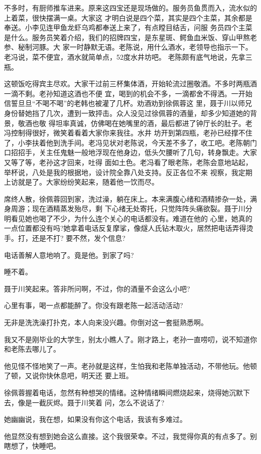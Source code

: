 \documentclass[11pt,a4paper,onecolumn]{article}
\begin{document}
不多时，有厨师推车进来。原来这四宝还是现场做的。服务员鱼贯而入，流水似的上着菜，很快摆满一桌。大家这
才明白说是四个菜，其实是四个主菜，其余都是奉送。小李见连甲鱼龙虾乌鸡都奉送上来了，有点瞠目结舌，问服
务员四个主菜是什么。服务员笑着介绍，我们的招牌四宝，是东星斑、鳄鱼血米饭、穿山甲熬老参、秘制河豚。大
家一时静默无语。老陈说，用什么酒水，老领导也指示一下。老冯说，菜不便宜，酒水就简单点，52度水井坊吧。
老陈颇有底气地说，先拿三瓶。

这顿饭吃得宾主尽欢。大家干过前三杯集体酒，开始轮流过圈敬酒。不多时两瓶酒一滴不剩。老孙知道这酒也不便
宜，喝到的机会不多，一滴都舍不得洒。一开始信誓旦旦“不喝不喝”的老韩也被灌了几杯。劝酒劝到徐佩蓉这
里，聂于川以师兄身份替她挡了几次，遭到一致抨击。众人没见过徐佩蓉的酒量，却多少知道她的背景，敬酒也敬
得坦率真诚，仿佛喝在她嘴里的酒，最后都进了钟厅长的肚子。老冯控制得很好，微笑着看着大家你来我往。水井
坊开到第四瓶，老孙已经撑不住了，小李扶着他到洗手间。老冯见状对老陈说，今天差不多了，收工吧。老陈朝门
口招招手，关主任鬼魅一般地浮现在他身边，低头欠腰听了几句，转身飘走。大家又等了等，老孙这才回来，吐得
面如土色。老冯看了眼老陈，老陈会意地站起，举杯说，八处是我的根据地，设计院全靠八处支持。反正各位不来
视察，我定期上访就是了。大家纷纷笑起来，随着他一饮而尽。

席终人散，徐佩蓉回到家，洗过澡，躺在床上。本来满腹心绪和酒精掺杂一处，满身周游；现在酒精蒸发殆尽，剩
下心绪无处寄托，只觉阵阵头痛欲裂。聂于川分明看见她也喝了不少，为什么连个关心的电话都没有。难道在他的
心里，她真的一点位置都没有吗?她拿着电话反复摩挲，像燧人氏钻木取火，居然把电话弄得烫手。打，还是不打?
要不然，发个信息?

电话善解人意地响了。竟是他。到家了吗?

睡不着。

聂于川笑起来。答非所问啊，不过，你的酒量不会这么小吧?

心里有事，喝一点都能醉了。你没有跟老陈一起活动活动?

无非是洗洗澡打扑克，本人向来没兴趣。你倒对这一套挺熟悉啊。

我又不是刚毕业的大学生，别太小瞧人了。刚才路上，老孙一直唠叨，说不知道你和老陈去哪儿了。

他见怪不怪地笑了一声。老孙就是这样，生怕我和老陈单独活动，不带他玩。他顿了顿，又说你快休息吧，明天还
要上班。

徐佩蓉握着电话，忽然有种想哭的情绪。这种情绪瞬间燃烧起来，烧得她沉默下去，像是一截灰烬。聂于川笑着
问，怎么不说话了?

她幽幽说，我在想，如果没有你这个电话，我该有多难过。

他显然没有想到她会这么直接。这个\myrule{}我很荣幸。不过，我觉得你真的有点多了。别瞎想了，快睡吧。
\end{document}
